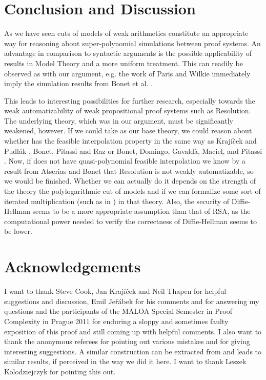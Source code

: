 \documentclass{LMCS}
\begin{document}
\section{Conclusion and Discussion}

As we have seen cuts of models of weak arithmetics constitute an appropriate way for reasoning about
super-polynomial simulations between proof systems. An advantage in comparison to syntactic arguments is the
possible applicability of results in Model Theory and a more uniform treatment. This can readily be observed as
with our argument, e.g. the work of Paris and Wilkie \cite{PW85}\cite{PW87} immediately imply the simulation
results from Bonet et al. \cite{BDGMP04}.

This leads to interesting possibilities for further research, especially towards the weak automatizability of
weak propositional proof systems such as Resolution. The underlying theory, which was  in our argument,
must be significantly weakened, however. If we could take  as our base theory, we could reason
about whether  has the feasible interpolation property in the same way as Kraj\' i\v cek and Pudl\'
ak \cite{KP98}, Bonet, Pitassi and Raz \cite{BPR00} or Bonet, Domingo, Gavald\`a, Maciel, and Pitassi
\cite{BDGMP04}. Now, if  does not have quasi-polynomial feasible interpolation we know by a result
from Atserias and Bonet \cite{AB04} that Resolution is not weakly automatizable, so we would be finished.
Whether we can actually do it depends on the strength of the theory the polylogarithmic cut of 
models and if we can formalize some sort of iterated multiplication (such as in \cite{ABH02}) in that theory.
Also, the security of Diffie-Hellman seems to be a more appropriate assumption than that of RSA, as the
computational power needed to verify the correctness of Diffie-Hellman seems to be lower.




\section{Acknowledgements}

I want to thank Steve Cook, Jan Kraj\' i\v cek and Neil Thapen for helpful suggestions and discussion, Emil Je\v
r\' abek for his comments and for answering my questions and the participants of the MALOA Special Semester in
Proof Complexity in Prague 2011 for enduring a sloppy and sometimes faulty exposition of this proof and still
coming up with helpful comments. I also want to thank the anonymous referees for pointing out various mistakes
and for giving interesting suggestions.
A similar construction can be extracted from \cite{Zam97} and leads to similar results, if perceived in the way we did it here. I want to thank Leszek Kolodziejczyk for pointing this out.
\end{document}
